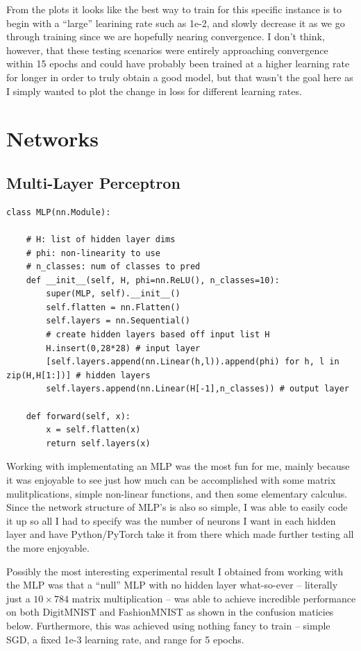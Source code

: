 \documentclass[12pt, twoside]{report}
\begin{document}
From the plots it looks like the best way to train for this specific instance is to
begin with a ``large'' learining rate such as 1e-2, and slowly decrease it as we go through training
since we are hopefully nearing convergence. I don't think, however, that these testing scenarios were
entirely approaching convergence within 15 epochs and could have probably been trained at a higher learning
rate for longer in order to truly obtain a good model, but that wasn't the goal here as I simply wanted to 
plot the change in loss for different learning rates.

\section{Networks}

\subsection{Multi-Layer Perceptron}

\begin{lstlisting}[style=Python,caption=MLP Class,label=lst:python]
class MLP(nn.Module):
    
    # H: list of hidden layer dims
    # phi: non-linearity to use
    # n_classes: num of classes to pred
    def __init__(self, H, phi=nn.ReLU(), n_classes=10):
        super(MLP, self).__init__()
        self.flatten = nn.Flatten()
        self.layers = nn.Sequential()
        # create hidden layers based off input list H
        H.insert(0,28*28) # input layer
        [self.layers.append(nn.Linear(h,l)).append(phi) for h, l in zip(H,H[1:])] # hidden layers
        self.layers.append(nn.Linear(H[-1],n_classes)) # output layer

    def forward(self, x):
        x = self.flatten(x)
        return self.layers(x)
\end{lstlisting}

Working with implementating an MLP was the most fun for me, mainly because it was enjoyable to see
just how much can be accomplished with some matrix mulitplications, simple non-linear functions, and
then some elementary calculus. Since the network structure of MLP's is also so simple, I was able to
easily code it up so all I had to specify was the number of neurons I want in each hidden layer and 
have Python/PyTorch take it from there which made further testing all the more enjoyable.

Possibly the most interesting experimental result I obtained from working with the MLP was
that a ``null'' MLP with no hidden layer what-so-ever – literally just a $10 \times 784$ matrix multiplication –
was able to achieve incredible performance on both DigitMNIST and FashionMNIST as shown in the 
confusion maticies below. Furthermore, this was achieved using nothing fancy to train – simple SGD,
a fixed 1e-3 learning rate, and range for 5 epochs.
\end{document}
